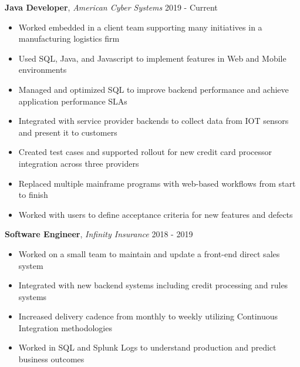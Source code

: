 \documentclass[9pt]{article}
\newenvironment{changemargin}[2]{%
  \begin{list}{}{%
      \setlength{\topsep}{0pt}%
      \setlength{\leftmargin}{#1}%
      \setlength{\rightmargin}{#2}%
      \setlength{\listparindent}{\parindent}%
      \setlength{\itemindent}{\parindent}%
      \setlength{\parsep}{\parskip}%
    }%
  \item[]}{\end{list}
}
\newenvironment{body} {
  \vspace*{-16pt}
  \begin{changemargin}{-0.25in}{-0.5in}
  }	
  {\end{changemargin}
}
\begin{document}
\begin{body}
  \vspace{17pt}
  \textbf{Java Developer}, \emph{American Cyber Systems} \hfill 2019 - Current \\
  \vspace*{-4pt}
  \begin{itemize} \itemsep -0pt
  \item Worked embedded in a client team supporting many initiatives in a manufacturing logistics firm
  \item Used SQL, Java, and Javascript to implement features in Web and Mobile environments
  \item Managed and optimized SQL to improve backend performance and achieve application performance SLAs
  \item Integrated with service provider backends to collect data from IOT sensors and present it to customers
  \item Created test cases and supported rollout for new credit card processor integration across three providers
  \item Replaced multiple mainframe programs with web-based workflows from start to finish
  \item Worked with users to define acceptance criteria for new features and defects
  \end{itemize}
  
  \vspace{17pt}
  \textbf{Software Engineer}, \emph{Infinity Insurance} \hfill 2018 - 2019 \\
  \vspace*{-4pt}
  \begin{itemize} \itemsep -0pt
  \item Worked on a small team to maintain and update a front-end direct sales system
  \item Integrated with new backend systems including credit processing and rules systems
  \item Increased delivery cadence from monthly to weekly utilizing Continuous Integration methodologies
  \item Worked in SQL and Splunk Logs to understand production and predict business outcomes
  \end{itemize}
  

\end{body}
\end{document}
